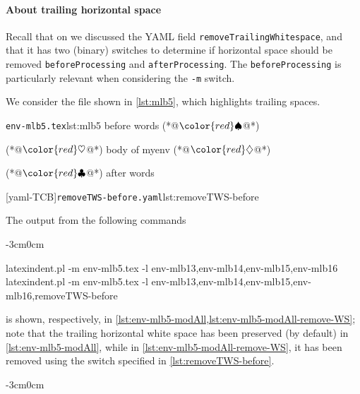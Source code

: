 \documentclass[10pt]{article}
\newenvironment{widepage}{\begin{adjustwidth}{-3cm}{0cm}}{\end{adjustwidth}}
\newcommand{\BeginStartsOnOwnLine}{\color{red}\spadesuit}
\newcommand{\BodyStartsOnOwnLine}{\color{red}\heartsuit}
\newcommand{\EndStartsOnOwnLine}{\color{red}\diamondsuit}
\newcommand{\EndFinishesWithLineBreak}{\color{red}\clubsuit}
\begin{document}
 \paragraph{About trailing horizontal space}
  Recall that on  we discussed the YAML field
  \texttt{removeTrailingWhitespace}, and that it has two (binary) switches to determine
  if horizontal space should be removed \texttt{beforeProcessing} and
  \texttt{afterProcessing}. The \texttt{beforeProcessing} is particularly relevant when
  considering the \texttt{-m} switch.

  \begin{example}
  We consider the file shown in \cref{lst:mlb5}, which highlights trailing spaces.

  \begin{cmhtcbraster}
   \begin{cmhlistings}[style=tcblatex,showspaces=true,escapeinside={(*@}{@*)}]{\texttt{env-mlb5.tex}}{lst:mlb5}
before words   (*@$\BeginStartsOnOwnLine$@*) 
\begin{myenv}           (*@$\BodyStartsOnOwnLine$@*)
body of myenv      (*@$\EndStartsOnOwnLine$@*) 
\end{myenv}     (*@$\EndFinishesWithLineBreak$@*)
after words
\end{cmhlistings}
   [yaml-TCB]{\texttt{removeTWS-before.yaml}}{lst:removeTWS-before}
  \end{cmhtcbraster}

  The output from the following commands 
  \begin{widepage}

   \begin{commandshell}
latexindent.pl -m env-mlb5.tex -l env-mlb13,env-mlb14,env-mlb15,env-mlb16
latexindent.pl -m env-mlb5.tex -l env-mlb13,env-mlb14,env-mlb15,env-mlb16,removeTWS-before
\end{commandshell}

  \end{widepage}
  is shown, respectively, in \cref{lst:env-mlb5-modAll,lst:env-mlb5-modAll-remove-WS};
  note that the trailing horizontal white space has been preserved (by default) in
  \cref{lst:env-mlb5-modAll}, while in \cref{lst:env-mlb5-modAll-remove-WS}, it has been
  removed using the switch specified in \cref{lst:removeTWS-before}.

  \begin{widepage}

  \end{widepage}
  \end{example}
\end{document}
